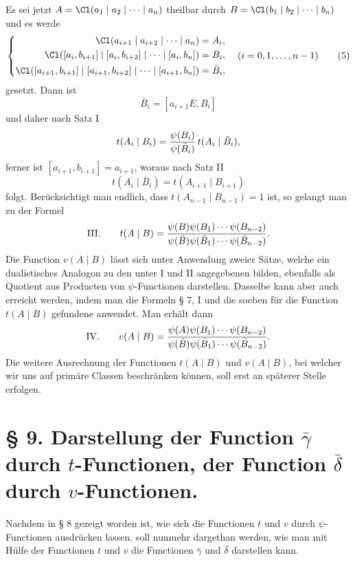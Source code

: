 Es sei jetzt $A=\Cl(a_1\mid a_2\mid\cdots\mid a_n)$ theilbar durch $B=\Cl(b_1\mid b_2\mid\cdots\mid b_n)$ und es werde
\begin{equation}
\left\{
\begin{aligned}
 \Cl(a_{i+1}\mid a_{i+2}\mid\cdots\mid a_n)&=A_i,\\
 \Cl([a_i,b_{i+1}]\mid[a_i,b_{i+2}]\mid\cdots\mid[a_i,b_n])&=B_i,\\
 \Cl([a_{i+1},b_{i+1}]\mid[a_{i+1},b_{i+2}]\mid\cdots\mid[a_{i+1},b_n])&=\bar B_i,
\end{aligned}
\right.
\quad (i=0,1,\ldots,n-1)
\tag{5}
\end{equation}
gesetzt. Dann ist
\[
 \bar B_i=[a_{i+1}E,B_i]
\]
und daher nach Satz I
\[
 t(A_i\mid B_i)={\psi(B_i)\over\psi(\bar B_i)}\,t(A_i\mid\bar B_i),
\]
ferner ist $[a_{i+1},b_{i+1}]=a_{i+1}$, woraus nach Satz II
\[
 t(A_i\mid\bar B_i)=t(A_{i+1}\mid B_{i+1})
\]
folgt. Berücksichtigt man endlich, dass $t(A_{n-1}\mid B_{n-1})=1$ ist, so gelangt man zu der Formel
\[
\text{III.}\qquad
 t(A\mid B)=
 {\psi(B)\psi(B_1)\cdots\psi(B_{n-2})
 \over
 \psi(\bar B)\psi(\bar B_1)\cdots\psi(\bar B_{n-2})}.
\]
Die Function $v(A\mid B)$ lässt sich unter Anwendung zweier Sätze, welche ein dualistisches Analogon zu den unter I und II angegebenen bilden, ebenfalls als Quotient aus Producten von $\psi$-Functionen darstellen. Dasselbe kann aber auch erreicht werden, indem man die Formeln § 7, I und die soeben für die Function $t(A\mid B)$ gefundene anwendet. Man erhält dann
\[
\text{IV.}\qquad
 v(A\mid B)=
 {\psi(A)\psi(B_1)\cdots\psi(B_{n-2})
 \over
 \psi(\bar B)\psi(\bar B_1)\cdots\psi(\bar B_{n-2})}.
\]
Die weitere Ausrechnung der Functionen $t(A\mid B)$ und $v(A\mid B)$, bei welcher wir uns auf primäre Classen beschränken können, soll erst an späterer Stelle erfolgen.

\section*{§ 9. Darstellung der Function $\bar\gamma$ durch $t$-Functionen, der Function $\bar\delta$ durch $v$-Functionen.}

Nachdem in § 8 gezeigt worden ist, wie sich die Functionen $t$ und $v$ durch $\psi$-Functionen ausdrücken lassen, soll nunmehr dargethan werden, wie man mit Hülfe der Functionen $t$ und $v$ die Functionen $\bar\gamma$ und $\bar\delta$ darstellen kann.
